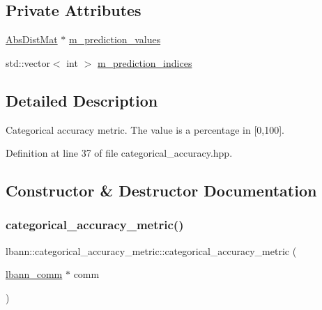 \subsection*{Private Attributes}
\begin{DoxyCompactItemize}
\item 
\hyperlink{base_8hpp_a9a697a504ae84010e7439ffec862b470}{Abs\+Dist\+Mat} $\ast$ \hyperlink{classlbann_1_1categorical__accuracy__metric_a796e50da721050d30e0cea709484154e}{m\+\_\+prediction\+\_\+values}
\item 
std\+::vector$<$ int $>$ \hyperlink{classlbann_1_1categorical__accuracy__metric_a369a86a91f08f3ad3b12b870ccf2e427}{m\+\_\+prediction\+\_\+indices}
\end{DoxyCompactItemize}


\subsection{Detailed Description}
Categorical accuracy metric. The value is a percentage in \mbox{[}0,100\mbox{]}. 

Definition at line 37 of file categorical\+\_\+accuracy.\+hpp.



\subsection{Constructor \& Destructor Documentation}
\mbox{\label{classlbann_1_1categorical__accuracy__metric_ae7ea6f472bd6375780c49277742af9dc}} 
\subsubsection{\texorpdfstring{categorical\+\_\+accuracy\+\_\+metric()}{categorical\_accuracy\_metric()}\hspace{0.1cm}{\footnotesize\ttfamily [1/2]}}
{\footnotesize\ttfamily lbann\+::categorical\+\_\+accuracy\+\_\+metric\+::categorical\+\_\+accuracy\+\_\+metric (\begin{DoxyParamCaption}\item[{\hyperlink{classlbann_1_1lbann__comm}{lbann\+\_\+comm} $\ast$}]{comm }\end{DoxyParamCaption})}

